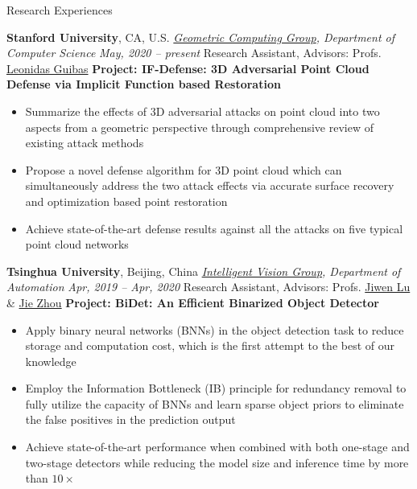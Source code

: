 \documentclass{resume} %
\begin{document}
\begin{rSection}{Research Experiences}

{\textbf{Stanford University}, CA, U.S.}\newline
\emph{\href{https://geometry.stanford.edu/}{Geometric Computing Group}, Department of Computer Science} \hfill {\em May, 2020 -- present}\newline
Research Assistant, Advisors: Profs. \href{https://geometry.stanford.edu/member/guibas/index.html}{Leonidas Guibas}\newline
\textbf{Project: IF-Defense: 3D Adversarial Point Cloud Defense via Implicit Function based Restoration}
\begin{itemize}
    \item Summarize the effects of 3D adversarial attacks on point cloud into two aspects from a geometric perspective through comprehensive review of existing attack methods
    \item Propose a novel defense algorithm for 3D point cloud which can simultaneously address the two attack effects via accurate surface recovery and optimization based point restoration
    \item Achieve state-of-the-art defense results against all the attacks on five typical point cloud networks\newline
\end{itemize}

\vspace{-0.12cm}

{\textbf{Tsinghua University}, Beijing, China}\newline
\emph{\href{http://ivg.au.tsinghua.edu.cn/index.php}{Intelligent Vision Group}, Department of Automation} \hfill {\em Apr, 2019 -- Apr, 2020}\newline
Research Assistant, Advisors: Profs. \href{http://ivg.au.tsinghua.edu.cn/Jiwen_Lu/}{Jiwen Lu} \& \href{https://www.tsinghua.edu.cn/publish/auen/1713/2011/20110506105532098625469/20110506105532098625469_.html}{Jie Zhou}\newline
\textbf{Project: BiDet: An Efficient Binarized Object Detector}
\begin{itemize}
    \item Apply binary neural networks (BNNs) in the object detection task to reduce storage and computation cost, which is the first attempt to the best of our knowledge
    \item Employ the Information Bottleneck (IB) principle for redundancy removal to fully utilize the capacity of BNNs and learn sparse object priors to eliminate the false positives in the prediction output
    \item Achieve state-of-the-art performance when combined with both one-stage and two-stage detectors while reducing the model size and inference time by more than $10\times$\newline
\end{itemize}


\end{rSection}
\end{document}
